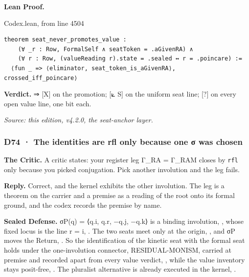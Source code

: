 \documentclass[10pt,twocolumn]{article}
\begin{document}
\textbf{Lean Proof.}

\begin{leanexcerpt}{Codex.lean, from line 4504}
\begin{lstlisting}[style=leanx,firstnumber=4504]
theorem seat_never_promotes_value :
    (∀ _r : Row, FormalSelf ∧ seatToken = .aGivenRA) ∧
    (∀ r : Row, (valueReading r).state = .sealed ↔ r = .poincare) :=
  ⟨fun _ => ⟨eliminator, seat_token_is_aGivenRA⟩, crossed_iff_poincare⟩
\end{lstlisting}
\end{leanexcerpt}

\textbf{Verdict.} ⇒ {[}X{]} on the promotion; {[}⟀ S{]} on the uniform
seat line; {[}?{]} on every open value line, one bit each.

\emph{Source: this edition, v4.2.0, the seat-anchor layer.}

\hypertarget{d74-the-identities-are-rfl-only-because-one-ux3c3-was-chosen}{%
\subsubsection{D74 · The identities are rfl only because one σ was
chosen}\label{d74-the-identities-are-rfl-only-because-one-ux3c3-was-chosen}}

\textbf{The Critic.} A critic states: your register leg Γ\_RA = Γ\_RAM
closes by \texttt{rfl} only because you picked conjugation. Pick another
involution and the leg fails.

\textbf{Reply.} Correct, and the kernel exhibits the other involution.
The leg is a theorem on the carrier and a premise as a reading of the
root onto its formal ground, and the codex records the premise by name.

\textbf{Sealed Defense.} σP(q) = ⟨q.i, q.r, −q.j, −q.k⟩ is a binding
involution, \texttt{}, whose fixed locus
is the line r = i, \texttt{}. The two
seats meet only at the origin,
\texttt{}, and σP moves the
Return, \texttt{}.
So the identification of the kinetic seat with the formal seat holds
under the one-involution connector, RESIDUAL-MONISM, carried at premise
and recorded apart from every value verdict,
\texttt{}, while the value
inventory stays posit-free,
\texttt{}. The pluralist
alternative is already executed in the kernel,
\texttt{}.
\end{document}
